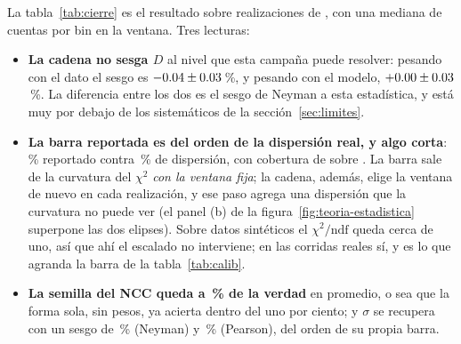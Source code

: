 \documentclass[11pt,a4paper]{article}
\begin{document}
\begin{table}[htbp]
\centering
\caption{El cierre con verdad conocida sobre \EjCorrida, con las dos formas
de pesar el $\chi^2$. La cobertura cuenta en cuántas realizaciones la $D$
verdadera quedó dentro de la barra reportada; con barras correctas se espera
el 68\,\%.}
\label{tab:cierre}
\footnotesize

\end{table}

La tabla~\ref{tab:cierre} es el resultado sobre \CierreN{} realizaciones de
\EjCorrida, con una mediana de \CierreCuentasBin{} cuentas por bin en la
ventana. Tres lecturas:
\begin{itemize}
\item \textbf{La cadena no sesga $D$} al nivel que esta campaña puede
      resolver: pesando con el dato el sesgo es
      $-0.04 \pm 0.03$\,\%, y pesando con el
      modelo, $+0.00 \pm 0.03$\,\%. La
      diferencia entre los dos es el sesgo de Neyman a esta estadística, y
      está muy por debajo de los sistemáticos de la
      sección~\ref{sec:limites}.
\item \textbf{La barra reportada es del orden de la dispersión real, y algo
      corta}: \CierreErrRepNeyman\,\% reportado contra \CierreDispNeyman\,\%
      de dispersión, con cobertura de \CierreCobNeyman{} sobre \CierreN.
      La barra sale de la curvatura del $\chi^2$ \emph{con la ventana fija};
      la cadena, además, elige la ventana de nuevo en cada realización, y
      ese paso agrega una dispersión que la curvatura no puede ver (el panel
      (b) de la figura~\ref{fig:teoria-estadistica} superpone las dos
      elipses). Sobre datos sintéticos el $\chi^2/\text{ndf}$ queda cerca de
      uno, así que ahí el escalado no interviene; en las corridas reales sí,
      y es lo que agranda la barra de la tabla~\ref{tab:calib}.
\item \textbf{La semilla del NCC queda a \CierreSemillaNeyman\,\% de la
      verdad} en promedio, o sea que la forma sola, sin pesos, ya acierta
      dentro del uno por ciento; y $\sigma$ se recupera con un sesgo de
      \CierreSesgoSigmaNeyman\,\% (Neyman) y \CierreSesgoSigmaPearson\,\%
      (Pearson), del orden de su propia barra.
\end{itemize}
\end{document}
